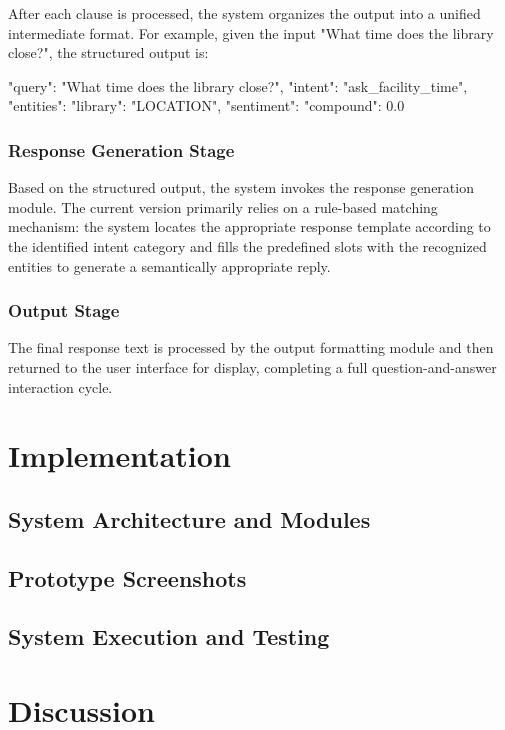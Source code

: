 \documentclass{xum_review}
\begin{document}
	After each clause is processed, the system organizes the output into a unified intermediate format. For example, given
	the input "What time does the library close?", the structured output is:

	\begin{json}
	{
		"query": "What time does the library close?",
		"intent": "ask_facility_time", 
		"entities": {"library": "LOCATION"},
		"sentiment": {"compound": 0.0}
	}
	\end{json}

	\subsubsection{Response Generation Stage}

	Based on the structured output, the system invokes the response generation module. The current version primarily relies
	on a rule-based matching mechanism: the system locates the appropriate response template according to the identified
	intent category and fills the predefined slots with the recognized entities to generate a semantically appropriate
	reply.

	\subsubsection{Output Stage}

	The final response text is processed by the output formatting module and then returned to the user interface for
	display, completing a full question-and-answer interaction cycle.

\section{Implementation}

	\subsection{System Architecture and Modules}

	\subsection{Prototype Screenshots}

	\subsection{System Execution and Testing}

\section{Discussion}
\end{document}
